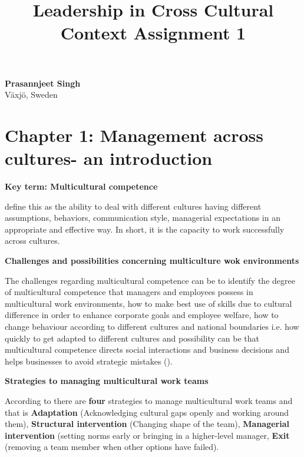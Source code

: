 \documentclass{article}
\title{Leadership in Cross Cultural Context Assignment 1 }
\begin{document}
\maketitle


\begin{center}
    \large \textbf{Prasannjeet Singh}\\
    \small Växjö, Sweden
\end{center}

\section{Chapter 1: Management across cultures- an introduction}
\textbf{Key term: Multicultural competence}
    
\cite{steers2013management} define this as the ability to deal with different cultures having different assumptions, behaviors, communication style, managerial expectations in an appropriate and effective way. In short, it is the capacity to work successfully across cultures.

\textbf{Challenges and possibilities concerning multiculture wok environments}

The challenges regarding multicultural competence can be to identify the degree of multicultural competence that managers and employees possess in multicultural work environments, how to make best use of skills due to cultural difference in order to enhance corporate goals and employee welfare, how to change behaviour according to different cultures and national boundaries i.e. how quickly to get adapted to different cultures and possibility can be that multicultural competence directs social interactions and business decisions and helps businesses to avoid strategic mistakes (\cite{steers2013management}).

\textbf{Strategies to managing multicultural work teams}

According to \cite{brett2009managing} there are \textbf{four} strategies to manage multicultural work teams and that is \textbf{Adaptation} (Acknowledging cultural gaps openly and working around them), \textbf{Structural intervention} (Changing shape of the team), \textbf{Managerial intervention} (setting norms early or bringing in a higher-level manager, \textbf{Exit} (removing a team member when other options have failed).
\end{document}
